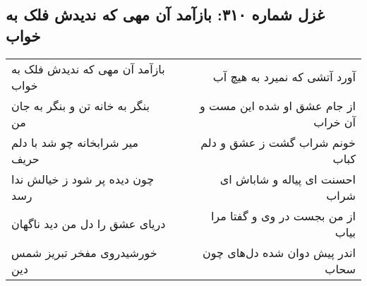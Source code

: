 \begin{center}
\section*{غزل شماره ۳۱۰: بازآمد آن مهی که ندیدش فلک به خواب}
\label{sec:0310}
\begin{longtable}{l p{0.5cm} r}
بازآمد آن مهی که ندیدش فلک به خواب
&&
آورد آتشی که نمیرد به هیچ آب
\\
بنگر به خانه تن و بنگر به جان من
&&
از جام عشق او شده این مست و آن خراب
\\
میر شرابخانه چو شد با دلم حریف
&&
خونم شراب گشت ز عشق و دلم کباب
\\
چون دیده پر شود ز خیالش ندا رسد
&&
احسنت ای پیاله و شاباش ای شراب
\\
دریای عشق را دل من دید ناگهان
&&
از من بجست در وی و گفتا مرا بیاب
\\
خورشیدروی مفخر تبریز شمس دین
&&
اندر پیش دوان شده دل‌های چون سحاب
\\
\end{longtable}
\end{center}
